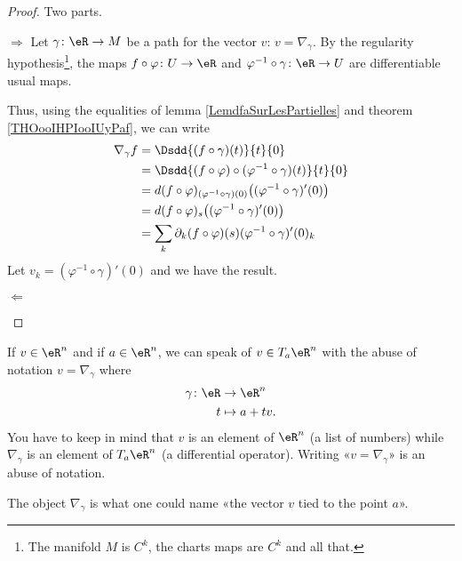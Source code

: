 \begin{proof}
    Two parts.
    \begin{subproof}
    \item[\( \Rightarrow\)]
    Let \( \gamma\colon \eR\to M\) be a path for the vector \( v\): \( v=\nabla_{\gamma}\). By the regularity hypothesis\footnote{The manifold \( M\) is \( C^k\), the charts maps are \( C^k\) and all that.}, the maps \( f\circ \varphi\colon U\to \eR\) and \( \varphi^{-1}\circ\gamma\colon \eR \to U \) are differentiable usual maps.

    Thus, using the equalities of lemma \ref{LemdfaSurLesPartielles} and theorem \ref{THOooIHPIooIUyPaf}, we can write
    \begin{subequations}
        \begin{align}
            \nabla_{\gamma}f&=\Dsdd{ (f\circ\gamma)(t) }{t}{0}\\
            &=\Dsdd{ (f\circ\varphi)\circ(\varphi^{-1}\circ\gamma)(t) }{t}{0}\\
            &=d(f\circ \varphi)_{(\varphi^{-1}\circ\gamma)(0)}\big( (\varphi^{-1}\circ\gamma)'(0) \big)\\
            &=d(f\circ \varphi)_{s}\big( (\varphi^{-1}\circ\gamma)'(0) \big)\\
            &=\sum_k\partial_k(f\circ \varphi)(s)(\varphi^{-1}\circ\gamma)'(0)_k
        \end{align}
    \end{subequations}
    Let \( v_k=(\varphi^{-1}\circ\gamma)'(0)\) and we have the result.
\item[$ \Leftarrow$ ]
    \end{subproof}
\end{proof}

\begin{normaltext}      \label{NORMooXAJGooDNyxjv}
    If \( v\in \eR^n\) and if \( a\in \eR^n\), we can speak of \( v\in T_a\eR^n\) with the abuse of notation \( v=\nabla_{\gamma}\) where
    \begin{equation}
        \begin{aligned}
            \gamma\colon \eR&\to \eR^n \\
            t&\mapsto a+tv.
        \end{aligned}
    \end{equation}
    You have to keep in mind that \( v\) is an element of \( \eR^n\) (a list of numbers) while \( \nabla_{\gamma}\) is an element of \( T_a\eR^n\) (a differential operator). Writing «\( v=\nabla_{\gamma}\)» is an abuse of notation.

    The object \( \nabla_{\gamma}\) is what one could name «the vector \( v\) tied to the point \( a\)».
\end{normaltext}


